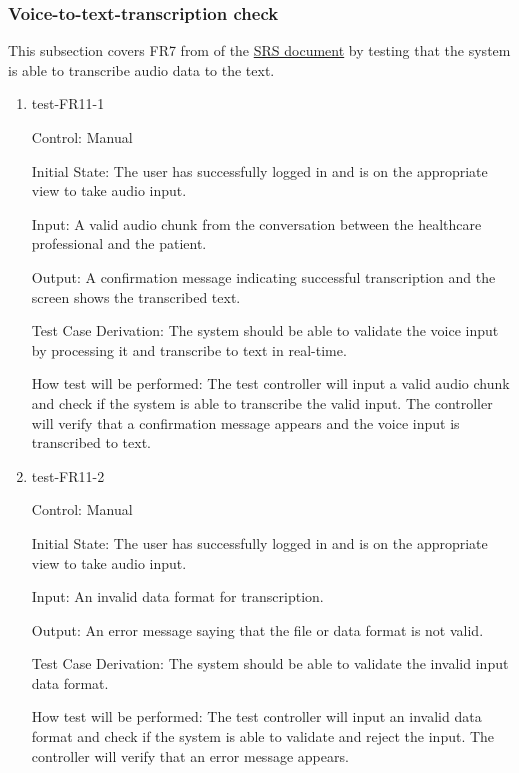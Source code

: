 \documentclass[12pt, titlepage]{article}
\begin{document}
\subsubsection{Voice-to-text-transcription check} \label{section:4.1.5}

This subsection covers FR7 from of the \href{https://github.com/Inreet-Kaur/capstone/blob/main/docs/SRS/SRS.pdf} {SRS document} by testing that the system is able to transcribe audio data to the text.

\begin{enumerate}

\item{test-FR11-1} \label{test-FR11-1}

Control: Manual

Initial State: The user has successfully logged in and is on the appropriate view to take audio input. 

Input: A valid audio chunk from the conversation between the healthcare professional and the patient.

Output: A confirmation message indicating successful transcription and the screen shows the transcribed text.

Test Case Derivation: The system should be able to validate the voice input by processing it and transcribe to text in real-time.

How test will be performed: The test controller will input a valid audio chunk and check if the system is able to transcribe the valid input. The controller will verify that a confirmation message appears and the voice input is transcribed to text.


\item{test-FR11-2} \label{test-FR11-2}

Control: Manual

Initial State: The user has successfully logged in and is on the appropriate view to take audio input.

Input: An invalid data format for transcription.

Output: An error message saying that the file or data format is not valid.

Test Case Derivation: The system should be able to validate the invalid input data format.

How test will be performed: The test controller will input an invalid data format and check if the system is able to validate and reject the input. The controller will verify that an error message appears.

\end{enumerate}
\end{document}
